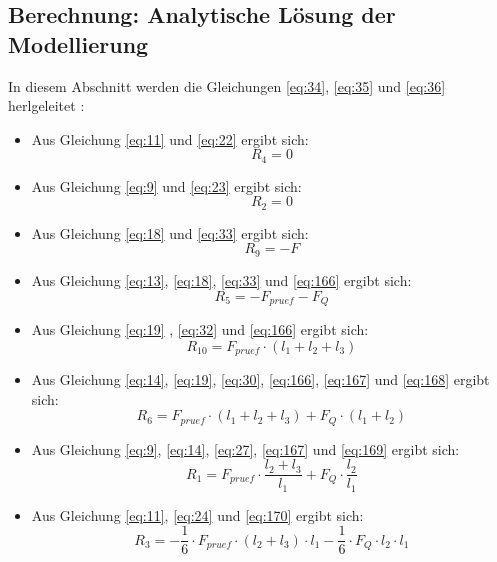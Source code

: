 \subsection{Berechnung: Analytische Lösung der Modellierung}\label{Lösung}
In diesem Abschnitt werden die Gleichungen \ref{eq:34}, \ref{eq:35} und \ref{eq:36} herlgeleitet \cite{item16}\cite{item9}:
\begin{itemize}
	\item Aus Gleichung \ref{eq:11} und \ref{eq:22} ergibt sich:
	\begin{equation}\label{eq:164}
		R_{4}=0
	\end{equation}
	\item Aus Gleichung \ref{eq:9} und \ref{eq:23} ergibt sich:
	\begin{equation}\label{eq:165}
		R_{2}=0
	\end{equation}
	\item Aus Gleichung \ref{eq:18} und \ref{eq:33} ergibt sich:
	\begin{equation}\label{eq:166}
		R_{9}=-F
	\end{equation}
	\item Aus Gleichung \ref{eq:13}, \ref{eq:18}, \ref{eq:33} und \ref{eq:166} ergibt sich:
	\begin{equation}\label{eq:167}
		R_{5}=-F_{pruef}-F_{Q}
	\end{equation}
	\item Aus Gleichung \ref{eq:19} , \ref{eq:32} und \ref{eq:166} ergibt sich:
	\begin{equation}\label{eq:168}
		R_{10}=F_{pruef}\cdot (l_{1}+l_{2}+l_{3})
	\end{equation}
	\item Aus Gleichung \ref{eq:14}, \ref{eq:19}, \ref{eq:30}, \ref{eq:166}, \ref{eq:167} und \ref{eq:168} ergibt sich:
	\begin{equation}\label{eq:169}
		R_{6}=F_{pruef}\cdot (l_{1}+l_{2}+l_{3}) + F_{Q}\cdot (l_{1}+l_{2})
	\end{equation}
	\item Aus Gleichung \ref{eq:9}, \ref{eq:14}, \ref{eq:27}, \ref{eq:167} und \ref{eq:169} ergibt sich:
	\begin{equation}\label{eq:170}
		R_{1}=F_{pruef}\cdot\frac{l_{2}+l_{3}}{l_{1}} + F_{Q}\cdot\frac{l_{2}}{l_{1}}
	\end{equation}
	\item Aus Gleichung \ref{eq:11}, \ref{eq:24} und \ref{eq:170} ergibt sich:
	\begin{equation}\label{eq:171}
		R_{3}=-\frac{1}{6}\cdot F_{pruef}\cdot (l_{2}+l_{3})\cdot l_{1} - \frac{1}{6}\cdot F_{Q}\cdot l_{2}\cdot l_{1}

\end{equation}
\end{itemize}
